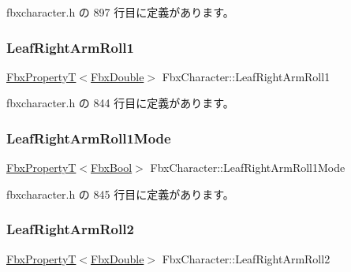  fbxcharacter.\+h の 897 行目に定義があります。

\mbox{\label{class_fbx_character_a4fa8ff40ed607255a808f3452d2c0cee}} 
\subsubsection{\texorpdfstring{Leaf\+Right\+Arm\+Roll1}{LeafRightArmRoll1}}
{\footnotesize\ttfamily \hyperlink{class_fbx_property_t}{Fbx\+PropertyT}$<$\hyperlink{fbxtypes_8h_a171e72a1c46fc15c1a6c9c31948c1c5b}{Fbx\+Double}$>$ Fbx\+Character\+::\+Leaf\+Right\+Arm\+Roll1}



 fbxcharacter.\+h の 844 行目に定義があります。

\mbox{\label{class_fbx_character_af27b4ee5dfd8968fa5e11554eb9b4ae2}} 
\subsubsection{\texorpdfstring{Leaf\+Right\+Arm\+Roll1\+Mode}{LeafRightArmRoll1Mode}}
{\footnotesize\ttfamily \hyperlink{class_fbx_property_t}{Fbx\+PropertyT}$<$\hyperlink{fbxtypes_8h_a92e0562b2fe33e76a242f498b362262e}{Fbx\+Bool}$>$ Fbx\+Character\+::\+Leaf\+Right\+Arm\+Roll1\+Mode}



 fbxcharacter.\+h の 845 行目に定義があります。

\mbox{\label{class_fbx_character_a6444cc6b1cbea36a03d6555c7e0cf7b8}} 
\subsubsection{\texorpdfstring{Leaf\+Right\+Arm\+Roll2}{LeafRightArmRoll2}}
{\footnotesize\ttfamily \hyperlink{class_fbx_property_t}{Fbx\+PropertyT}$<$\hyperlink{fbxtypes_8h_a171e72a1c46fc15c1a6c9c31948c1c5b}{Fbx\+Double}$>$ Fbx\+Character\+::\+Leaf\+Right\+Arm\+Roll2}



